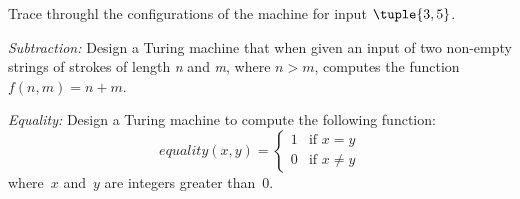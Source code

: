 \documentclass[../../../include/open-logic-section]{subfiles}
\begin{document}
\begin{prob}
Trace throughl the configurations of the machine for input $\tuple{3,5}$.
\end{prob}

\begin{prob}
\emph{Subtraction:} Design a Turing machine that when given an input of two non-empty 
strings of strokes of length \emph{n} and \emph{m}, where $n > m$, computes the 
function $f(n,m) = n + m$. 
\end{prob}

\begin{prob}
\emph{Equality:} Design a Turing machine to compute the following function:
\[
equality(x,y) = 
\begin{cases}
  \text{1} & \text{if~$x = y$} \\
  \text{0} & \text{if~$x \neq y$}
\end{cases}
\]
where~$x$ and~$y$ are integers greater than~$0$.
\end{prob}
\end{document}
